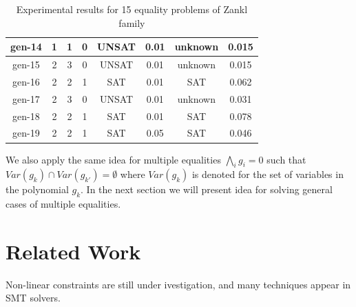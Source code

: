 \documentclass[runningheads,a4paper,oribibl]{llncs}
\begin{document}
{{\begin{table}
{\begin{tabular}[b]{|c|c|c|c|c|c|c|c|}
\hline
gen-14 & 1 & 1 & 0& UNSAT &0.01 & unknown &0.015\\
\hline
gen-15 & 2 & 3 & 0& UNSAT &0.01 & unknown &0.015\\
\hline
gen-16 & 2 & 2 & 1& SAT &0.01 & SAT &0.062\\
\hline
gen-17 & 2 & 3 & 0& UNSAT &0.01 & unknown &0.031\\
\hline
gen-18 & 2 & 2 & 1& SAT &0.01 & SAT &0.078\\
\hline
gen-19 & 2 & 2 & 1& SAT &0.05 & SAT &0.046\\
\hline
\end{tabular}
}
\caption{Experimental results for 15 equality problems of Zankl family}
\label{tab:eqexp}
\end{table}

We also apply the same idea for multiple equalities $\bigwedge \limits_{i} g_i = 0$ such that $Var(g_k) \cap Var(g_{k'}) = \emptyset$ where $Var(g_k)$ is denoted for the set of variables in the polynomial $g_k$. In the next section we will present idea for solving general cases of multiple equalities.
}

}


\section{Related Work} \label{sec:relate}

Non-linear constraints are still under ivestigation, and many techniques appear in SMT solvers. 
\end{document}
